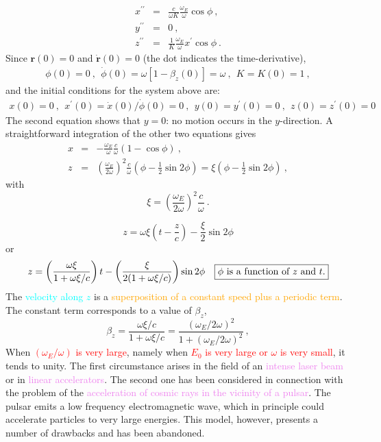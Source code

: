 \documentclass[12pt,a4paper]{article}
\renewcommand{\vec}[1]{\boldsymbol{#1}}
\begin{document}
\begin{eqnarray*}
x^{\prime\prime} &=& \frac{c}{\omega K} \frac{\omega_E}{\omega} \cos \phi ~, \\
y^{\prime\prime} &=& 0 ~, \\
z^{\prime\prime} &=& \frac{1}{K} \frac{\omega_E}{\omega} x^{\prime} \cos \phi ~.
\end{eqnarray*}
Since $\vec{r}(0) = 0$ and $\vec{\dot{r}}(0) = 0$ (the dot indicates the time-derivative), 
\begin{eqnarray*}
\phi(0) = 0 ~, ~~\dot{\phi}(0) = \omega [1-\beta_z(0)] = \omega ~, ~~ K = K(0) = 1~,
\end{eqnarray*}
and the initial conditions for the system above are:
\begin{eqnarray*}
x(0) = 0 ~, ~~x^\prime(0) = \dot{x}(0)/\dot{\phi}(0) = 0 ~, ~~ y(0) = y^\prime(0) = 0 ~, ~~ z(0) = z^\prime(0) = 0
\end{eqnarray*}
The second equation shows that $y = 0$: no motion occurs in the $y$-direction. A straightforward integration of the other two equations gives
\begin{eqnarray*}
x &=& -\frac{\omega_E}{\omega} \frac{c}{\omega} (1-\cos \phi) ~, \\
z &=& \left( \frac{\omega_E}{2\omega} \right)^2 \frac{c}{\omega} (\phi -\frac{1}{2}\sin 2\phi) = \xi(\phi -\frac{1}{2} \sin 2\phi) ~,
\end{eqnarray*}
with
\begin{equation*}
\xi = \left( \frac{\omega_E}{2\omega} \right)^2 \frac{c}{\omega} ~.
\end{equation*}

\begin{equation*}
z = \omega \xi(t-\frac{z}{c}) -\frac{\xi}{2} \sin 2\phi
\end{equation*}
or
\begin{equation}
z = \left(\frac{\omega \xi}{1+\omega \xi/c} \right) t -\left(\frac{\xi}{2(1+\omega \xi/c)} \right) \sin 2\phi ~~~\fbox{%
$\phi$ is a function of $z$ and $t$.}
\end{equation}
The \textcolor{cyan}{velocity along $z$} is a  \textcolor{orange}{superposition of a constant speed plus a periodic term}. The constant term corresponds to a value of $\beta_z$, 
\begin{equation*}
\beta_z = \frac{\omega \xi/c}{1+\omega \xi/c} = \frac{(\omega_E/2\omega)^2}{1+(\omega_E/2\omega)^2} ~,
\end{equation*}
When \textcolor{red}{$(\omega_E /\omega)$ is very large}, namely when \textcolor{red}{$E_0$ is very large or $\omega$ is very small}, it tends to unity. The first circumstance arises in the field of an \textcolor{violet}{intense laser beam} or in \textcolor{violet}{linear accelerators}. The second one has been considered in connection with the problem of the  \textcolor{violet}{acceleration of cosmic rays in the vicinity of a pulsar}. The pulsar emits a low frequency electromagnetic wave, which in principle could accelerate particles to very large energies. This model, however, presents a number of drawbacks and has been abandoned. 
\end{document}
